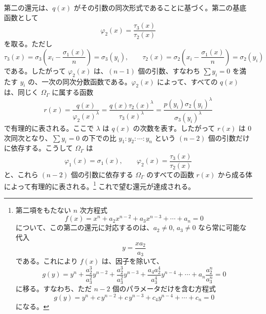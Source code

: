 第二の還元は、$q(x)$ がその引数の同次形式であることに基づく。第二の基底函数として
\[
\varphi_2(x)=\frac{\tau_3(x)}{\tau_2(x)}
\]
を取る。ただし
\[
\tau_3(x)=\sigma_3\left(x_i-\frac{\sigma_1(x)}{n}\right)=\sigma_3(y_i),
\qquad
\tau_2(x)=\sigma_2\left(x_i-\frac{\sigma_1(x)}{n}\right)=\sigma_2(y_i)
\]
である。したがって $\varphi_2(x)$ は、$(n-1)$ 個の引数、すなわち $\sum y_i=0$ を満たす $y_i$ の、一次の同次分数函数である。$\varphi_2(x)$ によって、すべての $q(x)$ は、同じく $\Omega_\Gamma$ に属する函数
\[
r(x)=\frac{q(x)}{\varphi_2(x)^\lambda}
=\frac{q(x)\tau_2(x)^\lambda}{\tau_3(x)^\lambda}
=\frac{p(y_i)\sigma_2(y_i)^\lambda}{\sigma_3(y_i)^\lambda}
\]
で有理的に表される。ここで $\lambda$ は $q(x)$ の次数を表す。したがって $r(x)$ は 0 次同次となり、$\sum y_i=0$ の下での比 $y_1:y_2:\cdots:y_n$ という $(n-2)$ 個の引数だけに依存する。こうして $\Omega_\Gamma$ は
\[
\varphi_1(x)=\sigma_1(x),
\qquad
\varphi_2(x)=\frac{\tau_3(x)}{\tau_2(x)}
\]
と、これら $(n-2)$ 個の引数に依存する $\Omega_\Gamma$ のすべての函数 $r(x)$ から成る体によって有理的に表される。\footnote{第二項をもたない $n$ 次方程式
\[
f(x)=x^n+a_2x^{n-2}+a_3x^{n-3}+\cdots+a_n=0
\]
について、この第二の還元に対応するのは、$a_2\ne0$, $a_3\ne0$ なら常に可能な代入
\[
y=\frac{x a_2}{a_3}
\]
である。これにより $f(x)$ は、因子を除いて、
\[
g(y)=y^n+\frac{a_2^3}{a_3^2}y^{n-2}+\frac{a_2^3}{a_3^2}y^{n-3}
+\frac{a_4a_2^4}{a_3^4}y^{n-4}+\cdots+a_n\frac{a_2^n}{a_3^n}=0
\]
に移る。すなわち、ただ $n-2$ 個のパラメータだけを含む方程式
\[
g(y)=y^n+c\,y^{n-2}+c\,y^{n-3}+c_4y^{n-4}+\cdots+c_n=0
\]
になる。} これで望む還元が達成される。

